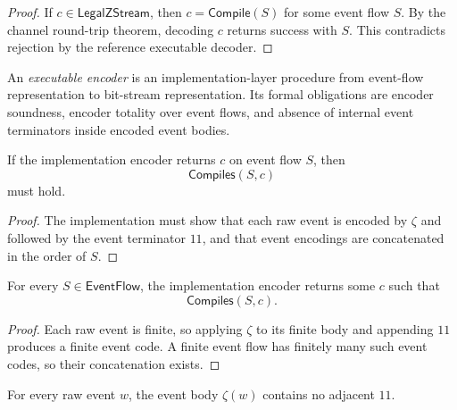 \begin{proof}
If $c\in\mathsf{LegalZStream}$, then $c=\mathsf{Compile}(S)$ for some event flow $S$. By the channel round-trip theorem, decoding $c$ returns success with $S$. This contradicts rejection by the reference executable decoder.
\end{proof}

\begin{definition}
\label{def:implementation-interface-executable-encoder}
An \emph{executable encoder} is an implementation-layer procedure from event-flow representation to bit-stream representation. Its formal obligations are encoder soundness, encoder totality over event flows, and absence of internal event terminators inside encoded event bodies.
\end{definition}

\begin{theorem}
\label{thm:implementation-interface-encoder-soundness-obligation}
If the implementation encoder returns $c$ on event flow $S$, then
$$
  \mathsf{Compiles}(S,c)
$$
must hold.
\end{theorem}

\begin{proof}
The implementation must show that each raw event is encoded by $\zeta$ and followed by the event terminator $11$, and that event encodings are concatenated in the order of $S$.
\end{proof}

\begin{theorem}
\label{thm:implementation-interface-encoder-totality-obligation}
For every $S\in\mathsf{EventFlow}$, the implementation encoder returns some $c$ such that
$$
  \mathsf{Compiles}(S,c).
$$
\end{theorem}

\begin{proof}
Each raw event is finite, so applying $\zeta$ to its finite body and appending $11$ produces a finite event code. A finite event flow has finitely many such event codes, so their concatenation exists.
\end{proof}

\begin{theorem}
\label{thm:implementation-interface-encoder-no-internal-terminator}
For every raw event $w$, the event body $\zeta(w)$ contains no adjacent $11$.
\end{theorem}

